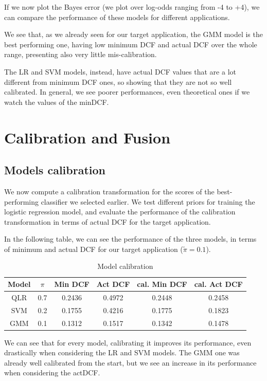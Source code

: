 \documentclass[12pt, a4paper]{article}
\begin{document}
If we now plot the Bayes error (we plot over log-odds ranging from -4 to +4), we can compare the performance of these models for different applications. 

We see that, as we already seen for our target application, the GMM model is the best performing one, having low minimum DCF and actual DCF over the whole range, presenting also very little mis-calibration.

The LR and SVM models, instead, have actual DCF values that are a lot different from minimum DCF ones, so showing that they are not so well calibrated. In general, we see poorer performances, even theoretical ones if we watch the values of the minDCF.
\clearpage

\section{Calibration and Fusion}

\subsection{Models calibration}
We now compute a calibration transformation for the scores of the best-performing classifier we selected earlier. We test different priors for training the logistic regression model, and evaluate the performance of the calibration transformation in terms of actual DCF for the target application.

In the following table, we can see the performance of the three models, in terms of minimum and actual DCF for our target application ($\tilde{\pi} = 0.1$).

\begin{table}[ht!]
	\centering
 	\begin{tabular}{| | c c | c c | c c | |} 
 		\hline
 		Model & $\pi$ & Min DCF & Act DCF & cal. Min DCF & cal. Act DCF\\
 		\hline\hline
 		QLR & 0.7 & 0.2436 & 0.4972 & 0.2448 & 0.2458\\
 		\hline
 		SVM & 0.2 & 0.1755 & 0.4216 & 0.1775 & 0.1823\\
 		\hline
 		GMM & 0.1 & 0.1312 & 0.1517 & 0.1342 & 0.1478\\
 		\hline
 	\end{tabular}
	\caption{Model calibration}
\end{table}

We can see that for every model, calibrating it improves its performance, even drastically when considering the LR and SVM models. The GMM one was already well calibrated from the start, but we see an increase in its performance when considering the actDCF.
\end{document}
